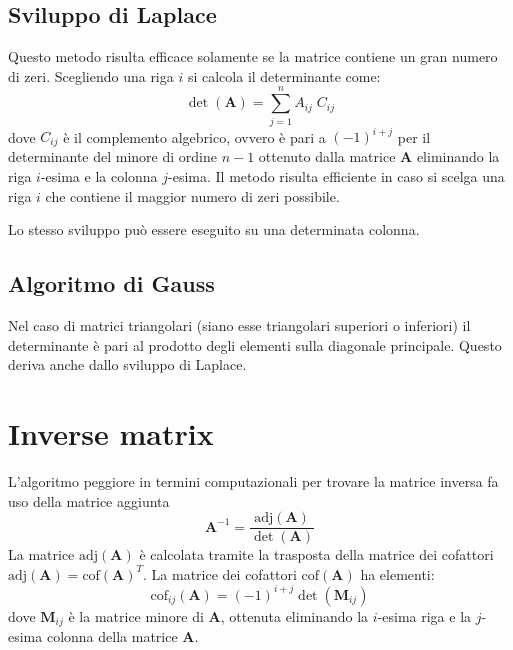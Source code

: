 \documentclass[10pt]{article}
\begin{document}
\subsection{Sviluppo di Laplace}

Questo metodo risulta efficace solamente se la matrice contiene un gran numero di zeri. Scegliendo una riga $i$ si calcola il determinante come:
\begin{equation}
\det(\mathbf{A}) = \sum_{j=1}^n A_{ij} \; C_{ij}
\end{equation}
dove $C_{ij}$ è il complemento algebrico, ovvero è pari a $(-1)^{i+j}$ per il determinante del minore di ordine $n-1$ ottenuto dalla matrice $\mathbf{A}$ eliminando la riga $i$-esima e la colonna $j$-esima.
Il metodo risulta efficiente in caso si scelga una riga $i$ che contiene il maggior numero di zeri possibile.

Lo stesso sviluppo può essere eseguito su una determinata colonna.

\subsection{Algoritmo di Gauss}

Nel caso di matrici triangolari (siano esse triangolari superiori o inferiori) il determinante è pari al prodotto degli elementi sulla diagonale principale. Questo deriva anche dallo sviluppo di Laplace.




\section{Inverse matrix}

L'algoritmo peggiore in termini computazionali per trovare la matrice inversa fa uso della matrice aggiunta
\begin{equation}
\mathbf{A}^{-1} = \frac{\text{adj}(\mathbf{A})}{\det(\mathbf{A})}
\end{equation}
La matrice $\text{adj}(\mathbf{A})$ è calcolata tramite la trasposta della matrice dei cofattori $\text{adj}(\mathbf{A}) = \text{cof}(\mathbf{A})^T$. La matrice dei cofattori $\text{cof}(\mathbf{A})$ ha elementi:
\begin{equation}
\text{cof}_{ij}(\mathbf{A}) = (-1)^{i+j} \det\left(\mathbf{M}_{ij}\right)
\end{equation}
dove $\mathbf{M}_{ij}$ è la matrice minore di $\mathbf{A}$, ottenuta eliminando la $i$-esima riga e la $j$-esima colonna della matrice $\mathbf{A}$.
\end{document}
